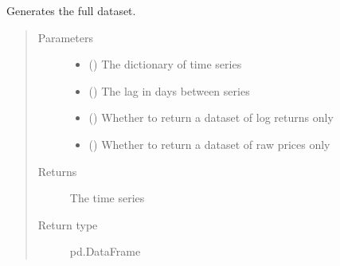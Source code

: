 \documentclass[letterpaper,10pt,english]{sphinxmanual}
\begin{document}
\begin{fulllineitems}
\label{\detokenize{preprocessing:Foresight.preprocessing.generate_dataset}}
Generates the full dataset.
\begin{quote}\begin{description}
\item[{Parameters}] \leavevmode\begin{itemize}
\item {} 
 () \textendash{} The dictionary of time series

\item {} 
 () \textendash{} The lag in days between series

\item {} 
 () \textendash{} Whether to return a dataset of log returns only

\item {} 
 () \textendash{} Whether to return a dataset of raw prices only

\end{itemize}

\item[{Returns}] \leavevmode
The time series

\item[{Return type}] \leavevmode
pd.DataFrame

\end{description}\end{quote}

\end{fulllineitems}

\end{document}
